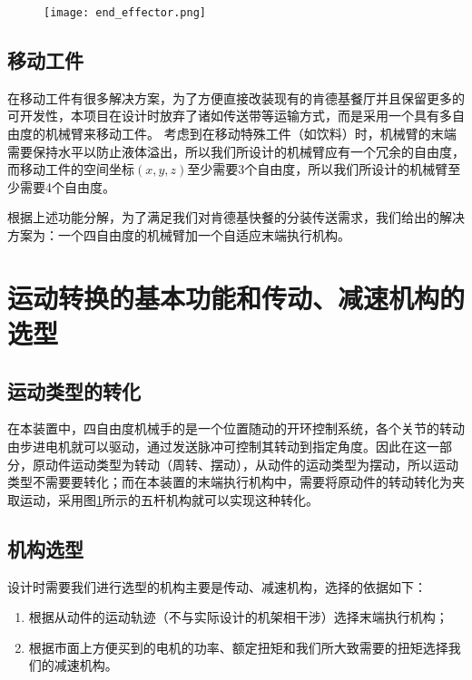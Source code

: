 \begin{figure}[!htp]
    \centering
    \texttt{[image: end\_effector.png]}
    \label{fig:endeffector}
\end{figure}
\subsection{移动工件}

在移动工件有很多解决方案，为了方便直接改装现有的肯德基餐厅并且保留更多的可开发性，本项目在设计时放弃了诸如传送带等运输方式，而是采用一个具有多自由度的机械臂来移动工件。
考虑到在移动特殊工件（如饮料）时，机械臂的末端需要保持水平以防止液体溢出，所以我们所设计的机械臂应有一个冗余的自由度，而移动工件的空间坐标$(x, y, z)$至少需要3个自由度，所以我们所设计的机械臂至少需要4个自由度。

\hfill

根据上述功能分解，为了满足我们对肯德基快餐的分装传送需求，我们给出的解决方案为：一个四自由度的机械臂加一个自适应末端执行机构。

\section{运动转换的基本功能和传动、减速机构的选型}

\subsection{运动类型的转化}

在本装置中，四自由度机械手的是一个位置随动的开环控制系统，各个关节的转动由步进电机就可以驱动，通过发送脉冲可控制其转动到指定角度。因此在这一部分，原动件运动类型为转动（周转、摆动），从动件的运动类型为摆动，所以运动类型不需要要转化；而在本装置的末端执行机构中，需要将原动件的转动转化为夹取运动，采用图\ref{fig:endeffector}所示的五杆机构就可以实现这种转化。

\subsection{机构选型}

设计时需要我们进行选型的机构主要是传动、减速机构，选择的依据如下：
\begin{enumerate}
    \item   根据从动件的运动轨迹（不与实际设计的机架相干涉）选择末端执行机构；
    \item   根据市面上方便买到的电机的功率、额定扭矩和我们所大致需要的扭矩选择我们的减速机构。
\end{enumerate}


